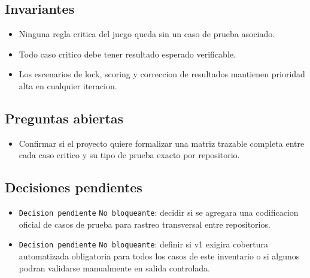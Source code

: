 \subsection{Invariantes}

\begin{itemize}
  \item Ninguna regla critica del juego queda sin un caso de prueba asociado.
  \item Todo caso critico debe tener resultado esperado verificable.
  \item Los escenarios de lock, scoring y correccion de resultados mantienen prioridad alta en cualquier iteracion.
\end{itemize}

\subsection{Preguntas abiertas}

\begin{itemize}
  \item Confirmar si el proyecto quiere formalizar una matriz trazable completa entre cada caso critico y su tipo de prueba exacto por repositorio.
\end{itemize}

\subsection{Decisiones pendientes}

\begin{itemize}
  \item \texttt{Decision pendiente} \texttt{No bloqueante}: decidir si se agregara una codificacion oficial de casos de prueba para rastreo transversal entre repositorios.
  \item \texttt{Decision pendiente} \texttt{No bloqueante}: definir si v1 exigira cobertura automatizada obligatoria para todos los casos de este inventario o si algunos podran validarse manualmente en salida controlada.
\end{itemize}
